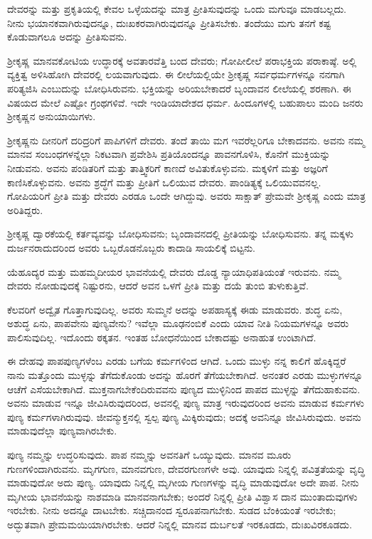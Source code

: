 ದೇವರನ್ನು ಮತ್ತು ಪ್ರಕೃತಿಯಲ್ಲಿ ಕೇವಲ ಒಳ್ಳೆಯದನ್ನು ಮಾತ್ರ ಪ್ರೀತಿಸುವುದನ್ನು ಒಂದು ಮಗುವೂ ಮಾಡಬಲ್ಲದು. ನೀನು ಭಯಾನಕವಾಗಿರುವುದನ್ನೂ, ದುಃಖಕರವಾಗಿರುವುದನ್ನೂ ಪ್ರೀತಿಸಬೇಕು. ತಂದೆಯು ಮಗು ತನಗೆ ಕಷ್ಟ ಕೊಡುವಾಗಲೂ ಅದನ್ನು ಪ್ರೀತಿಸುವನು.

ಶ‍್ರೀಕೃಷ್ಣ ಮಾನವಕೋಟಿಯ ಉದ್ಧಾರಕ್ಕೆ ಅವತಾರವೆತ್ತಿ ಬಂದ ದೇವರು; ಗೋಪೀಲೀಲೆ ಪರಾಭಕ್ತಿಯ ಪರಾಕಾಷ್ಠೆ. ಅಲ್ಲಿ ವ್ಯಕ್ತಿತ್ವ ಅಳಿಸಿಹೋಗಿ ದೇವರಲ್ಲಿ ಲಯವಾಗುವುದು. ಈ ಲೀಲೆಯಲ್ಲಿಯೇ ಶ‍್ರೀಕೃಷ್ಣ ಸರ್ವಧರ್ಮಗಳನ್ನೂ ನನಗಾಗಿ ಪರಿತ್ಯಜಿಸಿ ಎಂಬುದುನ್ನು ಬೋಧಿಸಿರುವನು. ಭಕ್ತಿಯನ್ನು ಅರಿಯಬೇಕಾದರೆ ಬೃಂದಾವನ ಲೀಲೆಯಲ್ಲಿ ಶರಣಾಗಿ. ಈ ವಿಷಯದ ಮೇಲೆ ಎಷ್ಟೋ ಗ್ರಂಥಗಳಿವೆ. ಇದೇ ಇಂಡಿಯಾದೇಶದ ಧರ್ಮ. ಹಿಂದೂಗಳಲ್ಲಿ ಬಹುಪಾಲು ಮಂದಿ ಜನರು ಶ‍್ರೀಕೃಷ್ಣನ ಅನುಯಾಯಿಗಳು.

ಶ‍್ರೀಕೃಷ್ಣನು ದೀನರಿಗೆ ದರಿದ್ರರಿಗೆ ಪಾಪಿಗಳಿಗೆ ದೇವರು. ತಂದೆ ತಾಯಿ ಮಗ ಇವರೆಲ್ಲರಿಗೂ ಬೇಕಾದವನು. ಅವನು ನಮ್ಮ ಮಾನವ ಸಂಬಂಧಗಳನ್ನೆಲ್ಲಾ ನಿಕಟವಾಗಿ ಪ್ರವೇಶಿಸಿ ಪ್ರತಿಯೊಂದನ್ನೂ ಪಾವನಗೊಳಿಸಿ, ಕೊನೆಗೆ ಮುಕ್ತಿಯನ್ನು ನೀಡುವನು. ಅವನು ಪಂಡಿತರಿಗೆ ಮತ್ತು ತಾತ್ತ್ವಿಕರಿಗೆ ಕಾಣದೆ ಅವಿತುಕೊಳ್ಳುವನು. ಮಕ್ಕಳಿಗೆ ಮತ್ತು ಅಜ್ಞರಿಗೆ ಕಾಣಿಸಿಕೊಳ್ಳುವನು. ಅವನು ಶ್ರದ್ಧೆಗೆ ಮತ್ತು ಪ್ರೀತಿಗೆ ಒಲಿಯುವ ದೇವರು. ಪಾಂಡಿತ್ಯಕ್ಕೆ ಒಲಿಯುವವನಲ್ಲ. ಗೋಪಿಯರಿಗೆ ಪ್ರೀತಿ ಮತ್ತು ದೇವರು ಎರಡೂ ಒಂದೇ ಆಗಿದ್ದುವು. ಅವರು ಸಾಕ್ಷಾತ್ ಪ್ರೇಮವೇ ಶ‍್ರೀಕೃಷ್ಣ ಎಂದು ಮಾತ್ರ ಅರಿತಿದ್ದರು.

ಶ‍್ರೀಕೃಷ್ಣ ದ್ವಾರಕೆಯಲ್ಲಿ ಕರ್ತವ್ಯವನ್ನು ಬೋಧಿಸುವನು; ಬೃಂದಾವನದಲ್ಲಿ ಪ್ರೀತಿಯನ್ನು ಬೋಧಿಸುವನು. ತನ್ನ ಮಕ್ಕಳು ದುರ್ಜನರಾದುದರಿಂದ ಅವರು ಒಬ್ಬರೊಡನೊಬ್ಬರು ಕಾದಾಡಿ ಸಾಯಲಿಕ್ಕೆ ಬಿಟ್ಟನು.

ಯೆಹೂದ್ಯರ ಮತ್ತು ಮಹಮ್ಮದೀಯರ ಭಾವನೆಯಲ್ಲಿ ದೇವರು ದೊಡ್ಡ ನ್ಯಾಯಾಧಿಪತಿಯಂತೆ ಇರುವನು. ನಮ್ಮ ದೇವರು ನೋಡುವುದಕ್ಕೆ ನಿಷ್ಟುರನು, ಆದರೆ ಅವನ ಒಳಗೆ ಪ್ರೀತಿ ಮತ್ತು ದಯೆ ತುಂಬಿ ತುಳುಕುತ್ತಿವೆ.

ಕೆಲವರಿಗೆ ಅದ್ವೈತ ಗೊತ್ತಾಗುವುದಿಲ್ಲ. ಅವರು ಸುಮ್ಮನೆ ಅದನ್ನು ಅಪಹಾಸ್ಯಕ್ಕೆ ಈಡು ಮಾಡುವರು. ಶುದ್ಧ ಏನು, ಅಶುದ್ಧ ಏನು, ಪಾಪವೇನು ಪುಣ್ಯವೇನು? ಇವೆಲ್ಲಾ ಮೂಢನಂಬಿಕೆ ಎಂದು ಯಾವ ನೀತಿ ನಿಯಮಗಳನ್ನೂ ಅವರು ಪಾಲಿಸುವುದಿಲ್ಲ. ಇದೊಂದು ಠಕ್ಕತನ. ಇಂತಹ ಬೋಧನೆಯಿಂದ ಬೇಕಾದಷ್ಟು ಅನಾಹುತ ಉಂಟಾಗಿದೆ.

ಈ ದೇಹವು ಪಾಪಪುಣ್ಯಗಳೆಂಬ ಎರಡು ಬಗೆಯ ಕರ್ಮಗಳಿಂದ ಆಗಿದೆ. ಒಂದು ಮುಳ್ಳು ನನ್ನ ಕಾಲಿಗೆ ಹೊಕ್ಕಿದ್ದರೆ ನಾನು ಮತ್ತೊಂದು ಮುಳ್ಳನ್ನು ತೆಗೆದುಕೊಂಡು ಅದನ್ನು ಹೊರಗೆ ತೆಗೆಯಬೇಕಾಗಿದೆ. ಅನಂತರ ಎರಡು ಮುಳ್ಳುಗಳನ್ನೂ ಆಚೆಗೆ ಎಸೆಯಬೇಕಾಗಿದೆ. ಮುಕ್ತನಾಗಬೇಕೆಂದಿರುವವನು ಪುಣ್ಯದ ಮುಳ್ಳಿನಿಂದ ಪಾಪದ ಮುಳ್ಳನ್ನು ತೆಗೆದುಹಾಕುವನು. ಅವನು ಮಾಡುವ ಇನ್ನೂ ಜೀವಿಸಿರುವುದರಿಂದ, ಅವನಲ್ಲಿ ಪುಣ್ಯ ಮಾತ್ರ ಇರುವುದರಿಂದ ಅವನು ಮಾಡುವ ಕರ್ಮಗಳು ಪುಣ್ಯ ಕರ್ಮಗಳಾಗಿರುವುವು. ಜೀವನ್ಮುಕ್ತನಲ್ಲಿ ಸ್ವಲ್ಪ ಪುಣ್ಯ ಮಿಕ್ಕಿರುವುದು; ಅದಕ್ಕೆ ಅವನಿನ್ನೂ ಜೀವಿಸಿರುವುದು. ಅವನು ಮಾಡುವುದೆಲ್ಲಾ ಪುಣ್ಯವಾಗಿರಬೇಕು.

ಪುಣ್ಯ ನಮ್ಮನ್ನು ಉದ್ಧರಿಸುವುದು. ಪಾಪ ನಮ್ಮನ್ನು ಅವನತಿಗೆ ಒಯ್ಯುವುದು. ಮಾನವ ಮೂರು ಗುಣಗಳಿಂದಾಗಿರುವನು. ಮೃಗಗುಣ, ಮಾನವಗುಣ, ದೇವರಗುಣಗಳೇ ಅವು. ಯಾವುದು ನಿನ್ನಲ್ಲಿ ಪವಿತ್ರತೆಯನ್ನು ವೃದ್ಧಿ ಮಾಡುವುದೋ ಅದು ಪುಣ್ಯ. ಯಾವುದು ನಿನ್ನಲ್ಲಿ ಮೃಗೀಯ ಗುಣಗಳನ್ನು ವೃದ್ಧಿ ಮಾಡುವುದೋ ಅದೇ ಪಾಪ. ನೀನು ಮೃಗೀಯ ಭಾವನೆಯನ್ನು ನಾಶಮಾಡಿ ಮಾನವನಾಗಬೇಕು; ಅಂದರೆ ನಿನ್ನಲ್ಲಿ ಪ್ರೀತಿ ವಿಶ್ವಾಸ ದಾನ ಮುಂತಾದುವುಗಳು ಇರಬೇಕು. ನೀನು ಅದನ್ನೂ ದಾಟಬೇಕು. ಸಚ್ಚಿದಾನಂದ ಸ್ವರೂಪನಾಗಬೇಕು. ಸುಡದ ಬೆಂಕಿಯಂತೆ ಇರಬೇಕು; ಅದ್ಭುತವಾಗಿ ಪ್ರೇಮಮಯಿಯಾಗಿರಬೇಕು. ಆದರೆ ನಿನ್ನಲ್ಲಿ ಮಾನವ ದುರ್ಬಲತೆ ಇರಕೂಡದು, ದುಃಖವಿರಕೂಡದು.

